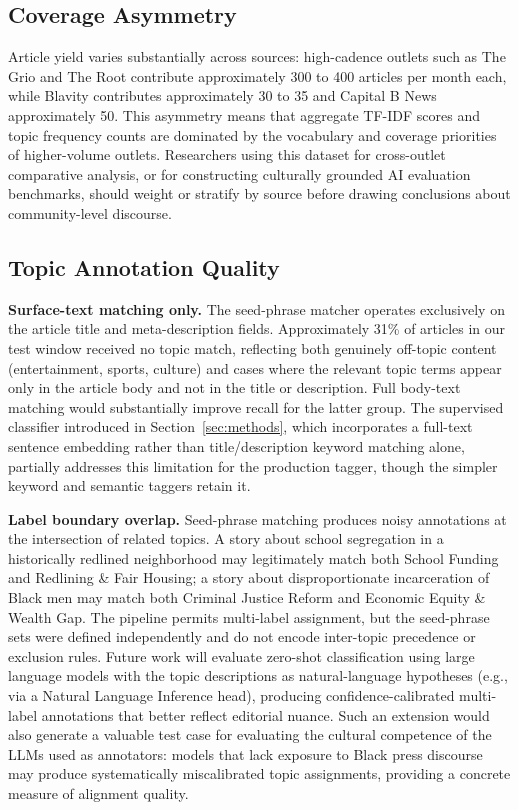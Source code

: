 \documentclass[letterpaper]{article}
\begin{document}
\subsection{Coverage Asymmetry}

Article yield varies substantially across sources: high-cadence outlets
such as The Grio and The Root contribute approximately 300 to 400
articles per month each, while Blavity contributes approximately 30 to
35 and Capital B News approximately 50. This asymmetry means that
aggregate TF-IDF scores and topic frequency counts are dominated by the
vocabulary and coverage priorities of higher-volume outlets. Researchers
using this dataset for cross-outlet comparative analysis, or for
constructing culturally grounded AI evaluation benchmarks, should weight
or stratify by source before drawing conclusions about
community-level discourse.

\subsection{Topic Annotation Quality}

\textbf{Surface-text matching only.} The seed-phrase matcher operates
exclusively on the article title and meta-description fields.
Approximately 31\% of articles in our test window received no topic
match, reflecting both genuinely off-topic content (entertainment,
sports, culture) and cases where the relevant topic terms appear only
in the article body and not in the title or description. Full
body-text matching would substantially improve recall for the latter
group. The supervised classifier introduced in
Section~\ref{sec:methods}, which incorporates a full-text sentence
embedding rather than title/description keyword matching alone,
partially addresses this limitation for the production tagger, though
the simpler keyword and semantic taggers retain it.

\textbf{Label boundary overlap.} Seed-phrase matching produces noisy
annotations at the intersection of related topics. A story about school
segregation in a historically redlined neighborhood may legitimately
match both School Funding and Redlining \& Fair Housing; a story about
disproportionate incarceration of Black men may match both Criminal
Justice Reform and Economic Equity \& Wealth Gap. The pipeline permits
multi-label assignment, but the seed-phrase sets were defined
independently and do not encode inter-topic precedence or exclusion
rules. Future work will evaluate zero-shot classification using large
language models with the topic descriptions as natural-language
hypotheses (e.g., via a Natural Language Inference head), producing
confidence-calibrated multi-label annotations that better reflect
editorial nuance. Such an extension would also generate a valuable test
case for evaluating the cultural competence of the LLMs used as
annotators: models that lack exposure to Black press discourse may
produce systematically miscalibrated topic assignments, providing a
concrete measure of alignment quality.
\end{document}
